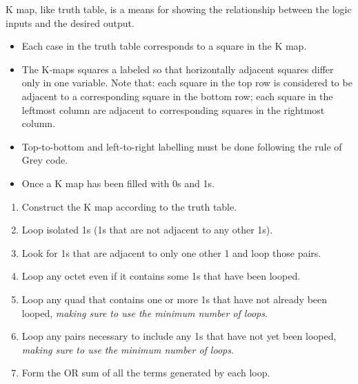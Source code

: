     \par K map, like truth table, is a means for showing the relationship between
    the logic inputs and the desired output.
    \begin{itemize}
      \item Each case in the truth table corresponds to a square in the K map.
      \item The K-maps squares a labeled so that horizontally adjacent squares differ
        only in one variable. Note that: each square in the top row is considered to be
        adjacent to a corresponding square in the bottom row; each square in the leftmost
        column are adjacent to corresponding squares in the rightmost column.
      \item Top-to-bottom and left-to-right labelling must be done following the rule of
        Grey code.
      \item Once a K map has been filled with 0s and 1s.
    \end{itemize}
    \begin{enumerate}
      \item Construct the K map according to the truth table.
      \item Loop isolated 1s (1s that are not adjacent to any other 1s).
      \item Look for 1s that are adjacent to only one other 1 and loop
      those pairs.
      \item Loop any octet even if it contains some 1s that have been looped.
      \item Loop any quad that contains one or more 1s that have not already been looped,
        \textit{making sure to use the minimum number of loops}.
      \item Loop any pairs necessary to include any 1s that have not yet been looped,
        \textit{making sure to use the minimum number of loops}.
      \item Form the OR sum of all the terms generated by each loop.
    \end{enumerate}

